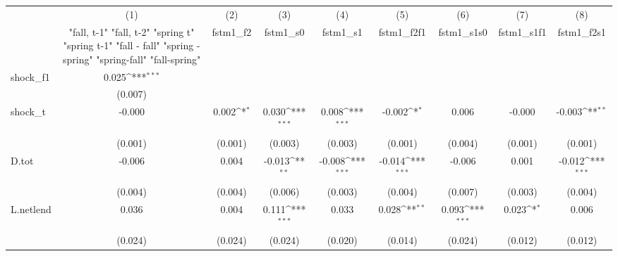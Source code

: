 {
\def\sym#1{\ifmmode^{#1}\else\(^{#1}\)\fi}
\begin{tabular}{l*{8}{c}}
\toprule
            &\multicolumn{1}{c}{(1)}&\multicolumn{1}{c}{(2)}&\multicolumn{1}{c}{(3)}&\multicolumn{1}{c}{(4)}&\multicolumn{1}{c}{(5)}&\multicolumn{1}{c}{(6)}&\multicolumn{1}{c}{(7)}&\multicolumn{1}{c}{(8)}\\
            &\multicolumn{1}{c}{  "fall, t-1" "fall, t-2" "spring t" "spring t-1"  "fall - fall" "spring - spring" "spring-fall" "fall-spring" }&\multicolumn{1}{c}{fstm1\_f2}&\multicolumn{1}{c}{fstm1\_s0}&\multicolumn{1}{c}{fstm1\_s1}&\multicolumn{1}{c}{fstm1\_f2f1}&\multicolumn{1}{c}{fstm1\_s1s0}&\multicolumn{1}{c}{fstm1\_s1f1}&\multicolumn{1}{c}{fstm1\_f2s1}\\
\midrule
shock\_f1    &       0.025\sym{***}&                     &                     &                     &                     &                     &                     &                     \\
            &     (0.007)         &                     &                     &                     &                     &                     &                     &                     \\
\addlinespace
shock\_t     &      -0.000         &       0.002\sym{*}  &       0.030\sym{***}&       0.008\sym{***}&      -0.002\sym{*}  &       0.006         &      -0.000         &      -0.003\sym{**} \\
            &     (0.001)         &     (0.001)         &     (0.003)         &     (0.003)         &     (0.001)         &     (0.004)         &     (0.001)         &     (0.001)         \\
\addlinespace
D.tot       &      -0.006         &       0.004         &      -0.013\sym{**} &      -0.008\sym{***}&      -0.014\sym{***}&      -0.006         &       0.001         &      -0.012\sym{***}\\
            &     (0.004)         &     (0.004)         &     (0.006)         &     (0.003)         &     (0.004)         &     (0.007)         &     (0.003)         &     (0.004)         \\
\addlinespace
L.netlend   &       0.036         &       0.004         &       0.111\sym{***}&       0.033         &       0.028\sym{**} &       0.093\sym{***}&       0.023\sym{*}  &       0.006         \\
            &     (0.024)         &     (0.024)         &     (0.024)         &     (0.020)         &     (0.014)         &     (0.024)         &     (0.012)         &     (0.012)         \\

\end{tabular}}
